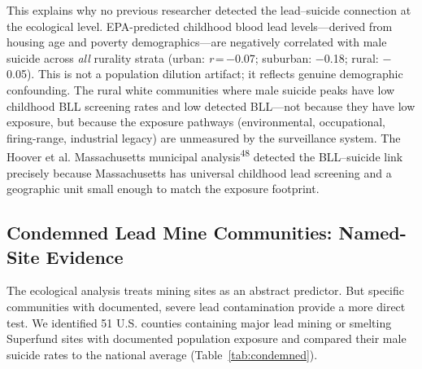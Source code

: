 \documentclass[11pt,twocolumn]{article}
\begin{document}
This explains why no previous researcher detected the lead--suicide connection at the ecological level. EPA-predicted childhood blood lead levels---derived from housing age and poverty demographics---are negatively correlated with male suicide across \textit{all} rurality strata (urban: \textit{r}\,=\,$-$0.07; suburban: $-$0.18; rural: $-$0.05). This is not a population dilution artifact; it reflects genuine demographic confounding. The rural white communities where male suicide peaks have low childhood BLL screening rates and low detected BLL---not because they have low exposure, but because the exposure pathways (environmental, occupational, firing-range, industrial legacy) are unmeasured by the surveillance system. The Hoover et al. Massachusetts municipal analysis\textsuperscript{48} detected the BLL--suicide link precisely because Massachusetts has universal childhood lead screening and a geographic unit small enough to match the exposure footprint.

\subsection{Condemned Lead Mine Communities: Named-Site Evidence}

The ecological analysis treats mining sites as an abstract predictor. But specific communities with documented, severe lead contamination provide a more direct test. We identified 51 U.S. counties containing major lead mining or smelting Superfund sites with documented population exposure and compared their male suicide rates to the national average (Table~\ref{tab:condemned}).
\end{document}
